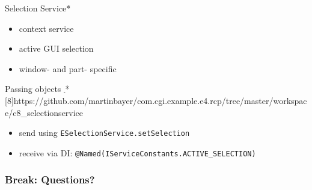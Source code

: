 \documentclass{beamer}
\makeatletter
\newcommand{\@eg}{\raisebox{-0.5mm}{\HandRight}}
\newcommand{\ice@eg}[2][]{\textcolor{ice}{\href{#2}{\@eg\,#1}}}
\newcommand{\pmp@eg}[2][]{\textcolor{pumpkin}{\href{#2}{\@eg\,#1}}}
\def\eg{\@ifstar\ice@eg\pmp@eg}
\newcommand{\breakframe}{\begin{fillerframe}\frametitle{Break: Questions?}\end{fillerframe}}
\newcommand{\ttt}[1]{\texttt{\color{honey}#1}}
\makeatother
\begin{document}
\begin{frame}{Selection Service*}%
	\begin{itemize}
		\item context service
		\item active GUI selection
		\item window- and part- specific
	\end{itemize}
	Passing objects \eg*[8]{https://github.com/martinbayer/com.cgi.example.e4.rcp/tree/master/workspace/c8_selectionservice}
	\begin{itemize}
		\item send using \ttt{ESelectionService.setSelection}
		\item receive via DI: \ttt{@Named(IServiceConstants.ACTIVE\_SELECTION)}
	\end{itemize}
\end{frame}%

\breakframe
\end{document}
